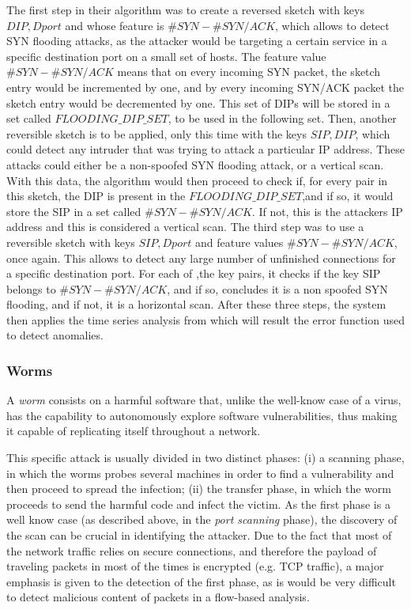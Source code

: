 \documentclass[runningheads,a4paper]{llncs}
\begin{document}
The first step in their algorithm was to create a reversed sketch with keys $ {DIP,Dport} $ and whose feature is $ \#SYN - \#SYN/ACK $, which allows to detect SYN flooding attacks, as the attacker would be targeting a certain service in a specific destination port on a small set of hosts. The feature value $ \#SYN - \#SYN/ACK $ means that on every incoming SYN packet, the sketch entry would be incremented by one, and by every incoming SYN/ACK packet the sketch entry would be decremented by one. This set of DIPs will be stored in a set called $FLOODING\_DIP\_SET$, to be used in the following set. Then, another reversible sketch is to be applied, only this time with the keys $ {SIP,DIP} $, which could detect any intruder that was trying to attack a particular IP address. These attacks could either be a non-spoofed SYN flooding attack, or a vertical scan. With this data, the algorithm would then proceed to check if, for every pair in this sketch, the DIP is present in the $FLOODING\_DIP\_SET$,and if so, it would store the SIP in a set called $ \#SYN - \#SYN/ACK $. If not, this is the attackers IP address and this is considered a vertical scan. The third step was to use a reversible sketch with keys ${SIP,Dport}$ and feature values $ \#SYN - \#SYN/ACK $, once again. This allows to detect any large number of unfinished connections for a specific destination port. For each of ,the key pairs, it checks if the key SIP belongs to $ \#SYN - \#SYN/ACK $, and if so, concludes it is a non spoofed SYN flooding, and if not, it is a horizontal scan. After these three steps, the system then applies the time series analysis from which will result the error function used to detect anomalies. 


\subsubsection{Worms}
A \textit{worm} consists on a harmful software that, unlike the well-know case of a virus, has the capability to autonomously explore software vulnerabilities, thus making it capable of replicating itself throughout a network.

This specific attack is usually divided in two distinct phases: (i) a scanning phase, in which the worms probes several machines in order to find a vulnerability and then proceed to spread the infection; (ii) the transfer phase, in which the worm proceeds to send the harmful code and infect the victim. As the first phase is a well know case (as described above, in the \textit{port scanning} phase), the discovery of the scan can be crucial in identifying the attacker. Due to the fact that most of the network traffic relies on secure connections, and therefore the payload of traveling packets in most of the times is encrypted (e.g. TCP traffic), a major emphasis is given to the detection of the first phase, as is would be very difficult to detect malicious content of packets in a flow-based analysis. 
\end{document}
